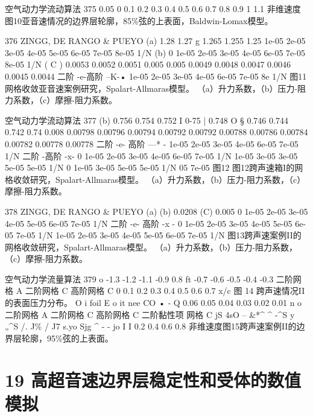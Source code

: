 \documentclass[UTF8,11pt,a4paper,openany,fontset=fandol]{ctexbook}
\begin{document}
空气动力学流动算法 375 0.05 0 0.1 0.2 0.3 0.4 0.5 0.6 0.7 0.8 0.9 1 1.1 非维速度图10亚音速情况的边界层轮廓，85\%弦的上表面，Baldwin-Lomax模型。

376 ZINGG, DE RANGO \& PUEYO (a) 1.28 1.27 g 1.265 1.255 1.25 1e-05 2e-05 3e-05 4e-05 5e-05 6e-05 7e-05 8e-05 1/N (b) 0 1e-05 2e-05 3e-05 4e-05 6e-05 7e-05 8e-05 1/N ( C ) 0.0053 0.0052 0.0051 0.005 0.005 0.0049 0.0048 0.0047 0.0046 0.0045 0.0044 二阶 -e-高阶 --K-• 1e-05 2e-05 3e-05 4e-05 6e-05 7e-05 8e 1/N 图11 网格收敛亚音速案例研究，Spalart-Allmaras模型。 （a）升力系数，（b）压力-阻力系数，（c）摩擦-阻力系数。

空气动力学流动算法 377 (b) 0.756 0.754 0.752 I 0-75 | 0.748 O § 0.746 0.744 0.742 0.74 0.008 0.00798 0.00796 0.00794 0.00792 0.00792 0.00788 0.00786 0.00784 0.00782 0.00778 0.00778 二阶 -e- 高阶 ---* - 1e-05 2e-05 3e-05 4e-05 6e-05 7e-05 1/N 二阶 -高阶 -x- 0 1e-05 2e-05 3e-05 4e-05 6e-05 7e-05 1/N 1e-05 3e-05 3e-05 5e-05 5e-05 1/N 0 1e-05 3e-05 5e-05 5e-05 1/N 05 7e-05 图12 图12跨声速箱I的网格收敛研究，Spalart-Allmaras模型。 （a）升力系数，（b）压力-阻力系数，（c）摩擦-阻力系数。

378 ZINGG, DE RANGO \& PUEYO (a) (b) 0.0208 (C) 0.005 0 1e-05 2e-05 3e-05 4e-05 5e-05 6e-05 7e-05 1/N 二阶 -e- 高阶 -x - 0 1e-05 2e-05 3e-05 4e-05 5e-05 6e-05 7e-05 1/N 1e-05 2e-05 3e-05 4e-05 5e-05 6e-05 7e-05 1/N 图13跨声速案例II的网格收敛研究，Spalart-Allmaras模型。 （a）升力系数，（b）压力-阻力系数，（c）摩擦-阻力系数。

空气动力学流量算法 379 o -1.3 -1.2 -1.1 -0.9 0.8 ft -0.7 -0.6 -0.5 -0.4 -0.3 二阶网格 A 二阶网格 C 高阶网格 C 0 0.1 0.2 0.3 0.4 0.5 0.6 0.7 x/c 图 14 跨声速情况II的表面压力分布。 O i foil E o it nee CO • - Q 0.06 0.05 0.04 0.03 0.02 0.01 n o 二阶网格 A 二阶网格 C 高阶网格 C 二阶黏性项 网格 C jS 4sO -- \&*\textasciicircum{} \textasciicircum{} -\textasciicircum{}S y „\textasciicircum{}S /. J\% / J7 s.yo Sjg \textasciicircum{} - - jo I I 0.2 0.4 0.6 0.8 非维速度图15跨声速案例II的边界层轮廓，95\%弦的上表面。

\clearpage
\chapter{19 高超音速边界层稳定性和受体的数值模拟}
\end{document}
